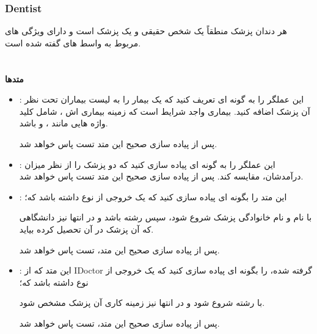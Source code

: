         \subsubsection{Dentist}
        هر دندان پزشک منطقاً یک شخص حقیقی و یک پزشک است و دارای ویژگی های مربوط به 
        واسط های گفته شده
        است.
        \\
        \\
        \\
        \textbf{متدها}
        \begin{itemize}
        \item 
            \grayBox{\textcolor{orange}{Operator +}}
            :
            این عملگر را به گونه ای تعریف کنید که یک بیمار را به لیست بیماران تحت نظر آن پزشک اضافه کنید.
            بیماری واجد شرایط است که زمینه بیماری اش ، شامل 
            کلید واژه هایی مانند 
            \grayBox{\textcolor{red}{Toothache}}
            ،
            \grayBox{\textcolor{red}{Teeth}}
            و
            \grayBox{\textcolor{red}{Dental}}
            باشد.
    
            پس از پیاده سازی صحیح این متد تست
            \grayBox{\textcolor{dkgreen}{AddingPatientsToDentist}}
            پاس خواهد شد.
        \item 
            \grayBox{\textcolor{orange}{Operator > / <}}
            :
            این عملگر را به گونه ای پیاده سازی کنید که دو پزشک را از نظر میزان درآمدشان، مقایسه کند.
            پس از پیاده سازی صحیح این متد تست
            \grayBox{\textcolor{dkgreen}{CompareDentists}}
            پاس خواهد شد.
        \item
            \grayBox{\textcolor{orange}{GraduatedFrom}}
            :
            این متد را بگونه ای پیاده سازی کنید که یک خروجی از نوع 
            \grayBox{\textcolor{blue}{string}}
            داشته باشد که؛
            
            با نام و نام خانوادگی پزشک شروع شود، سپس رشته 
            باشد و در انتها نیز دانشگاهی که آن پزشک در آن تحصیل کرده بیاید.
            
            پس از پیاده سازی صحیح این متد، تست
            \grayBox{\textcolor{dkgreen}{GraduatingDentists}}
            پاس خواهد شد.
            
        \item
            \grayBox{\textcolor{orange}{Work}}
            :
            این متد که از
            IDoctor
            گرفته شده،
            را بگونه ای پیاده سازی کنید که یک خروجی از نوع 
            \grayBox{\textcolor{blue}{string}}
            داشته باشد که؛
            
            با رشته
            شروع شود و در انتها نیز زمینه کاری آن پزشک مشخص شود.
            
            پس از پیاده سازی صحیح این متد، تست
            \grayBox{\textcolor{dkgreen}{WorkingDentists}}
            پاس خواهد شد.
        \end{itemize}
        
